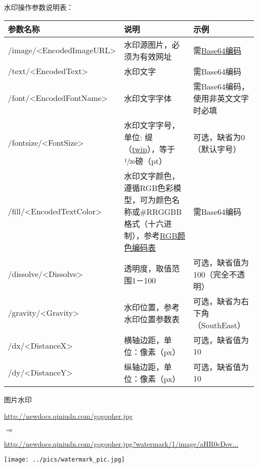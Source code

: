 \documentclass[11pt, oneside]{book}
\newcommand{\qsym}[1]{
\footnotesize
\noindent
#1\par
\normalsize
}
\newcommand{\qpara}[1]{
\vspace{0.3em}
\noindent
#1\par
\vspace{0.3em}
}
\newcommand{\qsamplelink}[1]{
\vspace{0.2em}
\noindent
#1\par
\vspace{0.1em}
}
\newcommand{\qurl}[1]{\footnotesize\url{#1}\normalsize}
\newcommand{\qtable}[1]{\footnotesize\vspace{0.5em}#1\vspace{0.5em}\normalsize}
\begin{document}
\qpara{水印操作参数说明表：}
\qtable{
\begin{tabular}[t]{|l|p{14em}|p{10em}|}
\hline
参数名称 & 说明 & 示例 \\
\hline
/image/\textless EncodedImageURL\textgreater & 水印源图片，必须为有效网址 & 需\href{http://zh.wikipedia.org/zh-cn/Base64}{Base64编码} \\
\hline
/text/\textless EncodedText\textgreater & 水印文字 & 需Base64编码 \\
\hline
/font/\textless EncodedFontName\textgreater & 水印文字字体 & 需Base64编码，使用非英文文字时必填 \\
\hline
/fontsize/\textless FontSize\textgreater & 水印文字字号，单位: 缇（\href{http://en.wikipedia.org/wiki/Twip}{twip}），等于$\sfrac{1}{20}$磅（pt） & 可选，缺省为0（默认字号） \\
\hline
/fill/\textless EncodedTextColor\textgreater & 水印文字颜色，遵循RGB色彩模型，可为颜色名称或\#RRGGBB格式（十六进制），参考\href{http://www.rapidtables.com/web/color/RGB_Color.htm}{RGB颜色编码表} & 需Base64编码 \\
\hline
/dissolve/\textless Dissolve\textgreater & 透明度，取值范围1－100 & 可选，缺省值为100（完全不透明） \\
\hline
/gravity/\textless Gravity\textgreater & 水印位置，参考水印位置参数表 & 可选，缺省为右下角（SouthEast） \\
\hline
/dx/\textless DistanceX\textgreater & 横轴边距，单位：像素（px） & 可选，缺省值为10 \\
\hline
/dy/\textless DistanceY\textgreater & 纵轴边距，单位：像素（px） & 可选，缺省值为10 \\
\hline
\end{tabular}
}

\begin{sample}
  \caption{图片水印}
    \qsamplelink{\qurl{http://newdocs.qiniudn.com/gogopher.jpg}}
    \qsym{$\Rightarrow$}
    \qsamplelink{\ttfamily\footnotesize\href{http://newdocs.qiniudn.com/gogopher.jpg?watermark/1/image/aHR0cDovL3d3dy5iMS5xaW5pdWRuLmNvbS9pbWFnZXMvbG9nby0yLnBuZw==}{http://newdocs.qiniudn.com/gogopher.jpg?watermark/1/image/aHR0cDov...}\normalsize}

    \begin{center}
      \texttt{[image: ../pics/watermark\_pic.jpg]}
    \end{center}
\end{sample}
\end{document}

